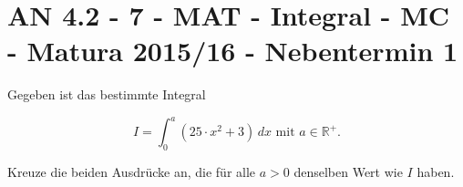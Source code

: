 \section{AN 4.2 - 7 - MAT - Integral - MC - Matura 2015/16 - Nebentermin 1}

\begin{beispiel}[AN 4.2]{1} %
Gegeben ist das bestimmte Integral

$$I=\int_{0}^{a}(25\cdot x^2+3)\,dx \text{ mit }a\in \mathbb{R}^+.$$

Kreuze die beiden Ausdrücke an, die für alle $a>0$ denselben Wert wie $I$ haben.

\end{beispiel}